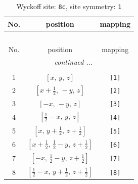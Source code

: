 \documentclass[fleqn,8pt]{jsarticle}
\begin{document}
\renewcommand{\arraystretch}{1.2}
\begin{longtable}{ccc}
\caption{Wyckoff site: {\tt 8c}, site symmetry: {\tt 1}}
 \\
 \hline \hline
No. & position & mapping \\ \hline \endfirsthead

\multicolumn{2}{l}{\tablename\ \thetable{}} \\
 \hline \hline
No. & position & mapping \\ \hline \endhead

 \hline \hline
\multicolumn{2}{r}{\footnotesize\it continued ...} \\ \endfoot

 \hline \hline
\multicolumn{2}{r}{} \\ \endlastfoot

1 & $\left[ x,\, y,\, z \right]$ & {\tt [1]} \\ \hline
2 & $\left[ x + \frac{1}{2},\, - y,\, z \right]$ & {\tt [2]} \\ \hline
3 & $\left[ - x,\, - y,\, z \right]$ & {\tt [3]} \\ \hline
4 & $\left[ \frac{1}{2} - x,\, y,\, z \right]$ & {\tt [4]} \\ \hline
5 & $\left[ x,\, y + \frac{1}{2},\, z + \frac{1}{2} \right]$ & {\tt [5]} \\ \hline
6 & $\left[ x + \frac{1}{2},\, \frac{1}{2} - y,\, z + \frac{1}{2} \right]$ & {\tt [6]} \\ \hline
7 & $\left[ - x,\, \frac{1}{2} - y,\, z + \frac{1}{2} \right]$ & {\tt [7]} \\ \hline
8 & $\left[ \frac{1}{2} - x,\, y + \frac{1}{2},\, z + \frac{1}{2} \right]$ & {\tt [8]} \\
\end{longtable}
\end{document}
